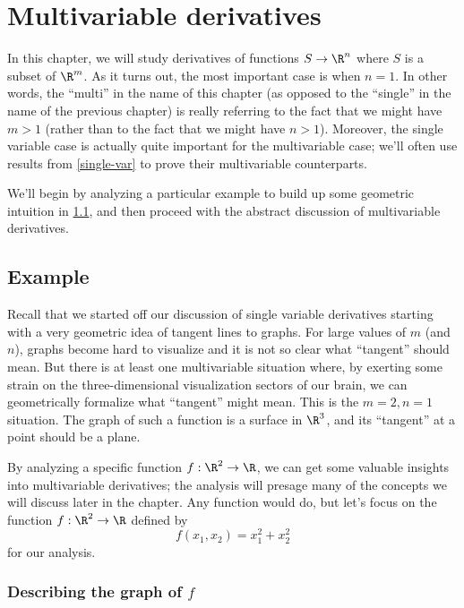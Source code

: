\chapter{Multivariable derivatives} \label{multivar}

In this chapter, we will study derivatives of functions $S \to \R^n$ where $S$ is a subset of $\R^m$. As it turns out, the most important case is when $n = 1$. In other words, the ``multi'' in the name of this chapter (as opposed to the ``single'' in the name of the previous chapter) is really referring to the fact that we might have $m > 1$ (rather than to the fact that we might have $n > 1$). Moreover,  the single variable case is actually quite important for the multivariable case; we'll often use results from \cref{single-var} to prove their multivariable counterparts. 

We'll begin by analyzing a particular example to build up some geometric intuition in \cref{multivar-introductory-example}, and then proceed with the abstract discussion of multivariable derivatives. 

\section{Example} \label{multivar-introductory-example}

Recall that we started off our discussion of single variable derivatives starting with a very geometric idea of tangent lines to graphs. For large values of $m$ (and $n$), graphs become hard to visualize and it is not so clear what ``tangent'' should mean. But there is at least one multivariable situation where, by exerting some strain on the three-dimensional visualization sectors of our brain, we can geometrically formalize what ``tangent'' might mean. This is the $m = 2, n = 1$ situation. The graph of such a function is a surface in $\R^3$, and its ``tangent'' at a point should be a plane. 

By analyzing a specific function $f : \R^2 \to \R$,  we can get some valuable insights into multivariable derivatives; the analysis will presage many of the concepts we will discuss later in the chapter. Any function would do, but let's focus on the function $f : \R^2 \to \R$ defined by
\[ f(x_1, x_2) = x_1^2 + x_2^2 \]
for our analysis.  

\subsection*{Describing the graph of \texorpdfstring{$f$}{f}}

